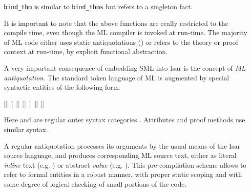 \begin{isabellebody}
\begin{isamarkuptext}
\begin{description}
  \item \verb|bind_thm| is similar to \verb|bind_thms| but refers to a
  singleton fact.

  \end{description}

  It is important to note that the above functions are really
  restricted to the compile time, even though the ML compiler is
  invoked at run-time.  The majority of ML code either uses static
  antiquotations () or refers to the theory or
  proof context at run-time, by explicit functional abstraction.%
\end{isamarkuptext}%
\isamarkuptrue%
%
\endisatagmlref
{\isafoldmlref}%
%
\isadelimmlref
%
\endisadelimmlref
%
\isamarkuptrue%
%
\begin{isamarkuptext}%
A very important consequence of embedding SML into Isar is the
  concept of \emph{ML antiquotation}.  The standard token language of
  ML is augmented by special syntactic entities of the following form:

  \begin{railoutput}
\rail@bar
{}[]
[]
[]
[]
[]
[]
[]
\rail@endbar
\rail@end
\end{railoutput}


  Here \hyperlink{syntax.nameref}{\mbox{}} and \hyperlink{syntax.args}{\mbox{}} are regular outer syntax
  categories \cite{isabelle-isar-ref}.  Attributes and proof methods
  use similar syntax.

  \medskip A regular antiquotation  processes
  its arguments by the usual means of the Isar source language, and
  produces corresponding ML source text, either as literal
  \emph{inline} text (e.g. ) or abstract
  \emph{value} (e.g. ).  This pre-compilation
  scheme allows to refer to formal entities in a robust manner, with
  proper static scoping and with some degree of logical checking of
  small portions of the code.


\end{isamarkuptext}
\end{isabellebody}

